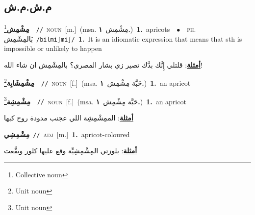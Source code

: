 \documentclass[10pt,a4paper,twoside]{article} %
\begin{document}
\begin{multicols}{2}
\vspace{-3mm}
\subsection*{\color{blue}\foreignlanguage{arabic}{م.ش.م.ش}\color{blue}{}} 

{\setlength\topsep{0pt}\textbf{\foreignlanguage{arabic}{مِشْمِش}}\footnote{Collective noun}\ \ {\color{gray}\texttt{//}\color{black}}\ \textsc{noun}\ [m.]\ \color{gray}(msa. \foreignlanguage{arabic}{مِشْمِش}~\foreignlanguage{arabic}{\textbf{١.}})\color{black}\ \textbf{1.}~apricots\ \ $\bullet$\ \ \textsc{ph.} \color{gray} \foreignlanguage{arabic}{بَالمِشْمِش}\color{black}\ {\color{gray}\texttt{/{\sffamily bilmiʃmiʃ}/}\color{black}}\ \textbf{1.}~It is an idiomatic expression that means that sth is impossible or unlikely to happen\  \begin{flushright}\color{gray}\foreignlanguage{arabic}{\textbf{\underline{\foreignlanguage{arabic}{أمثلة}}}: قلتلي إِنَّك بدَّك تصير زي بشار المصري؟ بالمِشْمِش ان شاء الله!}\end{flushright}\color{black}} \vspace{2mm}

{\setlength\topsep{0pt}\textbf{\foreignlanguage{arabic}{مِشْمِشَايِة}}\footnote{Unit noun}\ \ {\color{gray}\texttt{//}\color{black}}\ \textsc{noun}\ [f.]\ \color{gray}(msa. \foreignlanguage{arabic}{حَبَّة مِشْمِش}~\foreignlanguage{arabic}{\textbf{١.}})\color{black}\ \textbf{1.}~an apricot\ } \vspace{2mm}

{\setlength\topsep{0pt}\textbf{\foreignlanguage{arabic}{مِشْمِشِة}}\footnote{Unit noun}\ \ {\color{gray}\texttt{//}\color{black}}\ \textsc{noun}\ [f.]\ \color{gray}(msa. \foreignlanguage{arabic}{حَبَّة مِشْمِش}~\foreignlanguage{arabic}{\textbf{١.}})\color{black}\ \textbf{1.}~an apricot\  \begin{flushright}\color{gray}\foreignlanguage{arabic}{\textbf{\underline{\foreignlanguage{arabic}{أمثلة}}}: الممِشْمِشِة اللي عجنب مدودة روح كبها}\end{flushright}\color{black}} \vspace{2mm}

{\setlength\topsep{0pt}\textbf{\foreignlanguage{arabic}{مِشْمِشِي}}\ {\color{gray}\texttt{//}\color{black}}\ \textsc{adj}\ [m.]\ \textbf{1.}~apricot-coloured\  \begin{flushright}\color{gray}\foreignlanguage{arabic}{\textbf{\underline{\foreignlanguage{arabic}{أمثلة}}}: بلوزتي المِشْمِشِيِّة وقع عليها كلور وبقَّعت}\end{flushright}\color{black}} \vspace{2mm}


\end{multicols}
\end{document}
